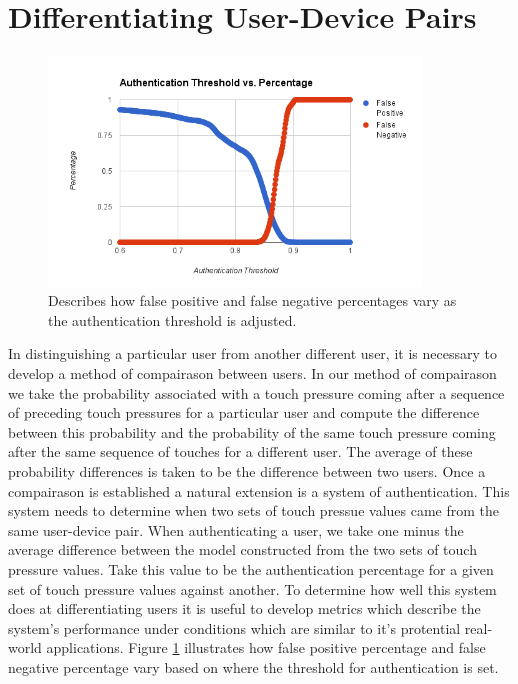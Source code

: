 \documentclass{acm_proc_article-sp}
\begin{document}
\section{Differentiating User-Device Pairs}
\label{sec:differentiation}

\begin{figure}
\centering
\includegraphics[width=3.9in]{threshold_vs_percentages.png}
\caption{Describes how false positive and false negative percentages vary as the authentication threshold is adjusted.}
\label{fig:threshold_vs_percentages}
\end{figure}

In distinguishing a particular user from another different user, it is necessary to develop a method of compairason between users. In our method of compairason we take the probability associated with a touch pressure coming after a sequence of preceding touch pressures for a particular user and compute the difference between this probability and the probability of the same touch pressure coming after the same sequence of touches for a different user. The average of these probability differences is taken to be the difference between two users.
%
Once a compairason is established a natural extension is a system of authentication. This system needs to determine when two sets of touch pressue values came from the same user-device pair. When authenticating a user, we take one minus the average difference between the model constructed from the two sets of touch pressure values. Take this value to be the authentication percentage for a given set of touch pressure values against another.
%
To determine how well this system does at differentiating users it is useful to develop metrics which describe the system's performance under conditions which are similar to it's protential real-world applications. Figure \ref{fig:threshold_vs_percentages} illustrates how false positive percentage and false negative percentage vary based on where the threshold for authentication is set. 
\end{document}
